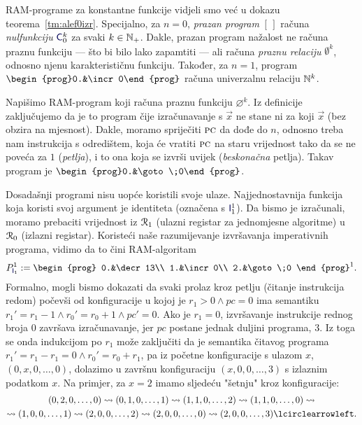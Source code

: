 
RAM-programe za konstantne funkcije vidjeli smo već u dokazu teorema~\ref{tm:alef0izr}. Specijalno, za $n=0$, \emph{prazan program} $[\,]$ računa \emph{nulfunkciju} $\f{C}_0^k$ za svaki $k\in{\mathbb N}_+$. Dakle, prazan program nažalost ne računa praznu funkciju --- što bi bilo lako zapamtiti --- ali računa \emph{praznu relaciju} $\emptyset^k$, odnosno njenu karakterističnu funkciju. Također, za $n=1$, program $\begin{prog}0.&\incr0\end{prog}$ računa univerzalnu relaciju ${\mathbb N}^k$.

Napišimo RAM-program koji računa praznu funkciju $\varnothing^k$. Iz definicije zaključujemo da je to program čije izračunavanje s $\vec x$ ne stane ni za koji $\vec x$ (bez obzira na mjesnost). Dakle, moramo spriječiti $\textsc{pc}$ da dođe do $n$, odnosno treba nam instrukcija s odredištem, koja će vratiti $\textsc{pc}$ na staru vrijednost tako da se ne poveća za $1$ (\emph{petlja}), i to ona koja se izvrši uvijek (\emph{beskonačna} petlja). Takav program je $\begin{prog}0.&\goto\;0\end{prog}$.

Dosadašnji programi nisu uopće koristili svoje ulaze. Najjednostavnija funkcija koja koristi svoj argument je identiteta (označena s $\f I_1^1$). Da bismo je izračunali, moramo prebaciti vrijednost iz $\mathcal R_{1}$ (ulazni registar za jednomjesne algoritme) u $\mathcal R_{0}$ (izlazni registar). Koristeći naše razumijevanje izvršavanja imperativnih programa, vidimo da to čini RAM-algoritam
\begin{equation}\label{eq:RAMid}
    P_{\f I_1}^1:=\begin{prog}
        0.&\decr13\\
        1.&\incr0\\
        2.&\goto\;0
    \end{prog}^1\text.
\end{equation}
Formalno, mogli bismo dokazati da svaki prolaz kroz petlju (čitanje instrukcija redom) počevši od konfiguracije u kojoj je $r_1>0\land pc=0$ ima semantiku $r_1'=r_1-1\land r_0'=r_0+1\land pc'=0$. Ako je $r_1=0$, izvršavanje instrukcije rednog broja $0$ završava izračunavanje, jer $pc$ postane jednak duljini programa, $3$. Iz toga se onda indukcijom po $r_1$ može zaključiti da je semantika čitavog programa $r_1'=r_1-r_1=0\land r_0'=r_0+r_1$, pa iz početne konfiguracije s ulazom $x$, $(0,x,0,\dotsc,0)$, dolazimo u završnu konfiguraciju $(x,0,0,\dotsc,3)$ s izlaznim podatkom $x$. Na primjer, za $x=2$ imamo sljedeću "šetnju" kroz konfiguracije:
\begin{multline}
    (0,2,0,\dotsc,0)\leadsto
    (0,1,0,\dotsc,1)\leadsto
    (1,1,0,\dotsc,2)\leadsto
    (1,1,0,\dotsc,0)\leadsto\\
    \leadsto(1,0,0,\dotsc,1)\leadsto
    (2,0,0,\dotsc,2)\leadsto
    (2,0,0,\dotsc,0)\leadsto
    (2,0,0,\dotsc,3)\lcirclearrowleft\text.
\end{multline}

